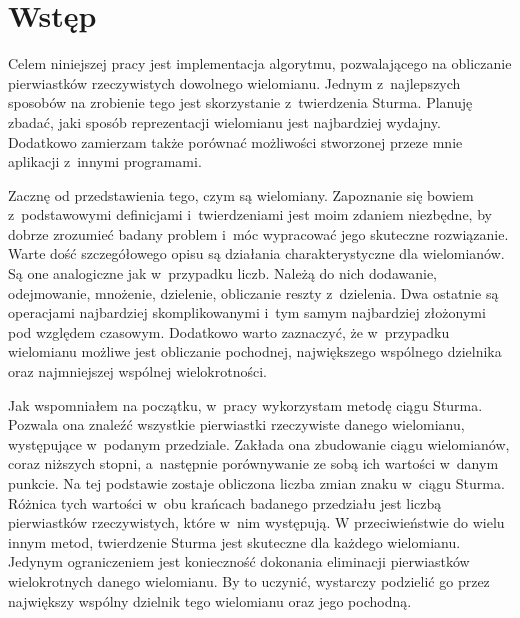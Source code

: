 \chapter{Wstęp}

Celem niniejszej pracy jest implementacja algorytmu, pozwalającego na obliczanie pierwiastków rzeczywistych dowolnego wielomianu. Jednym z~najlepszych sposobów na zrobienie tego jest skorzystanie z~twierdzenia Sturma. Planuję zbadać, jaki sposób reprezentacji wielomianu jest najbardziej wydajny. Dodatkowo zamierzam także porównać możliwości stworzonej przeze mnie aplikacji z~innymi programami.

Zacznę od przedstawienia tego, czym są wielomiany. Zapoznanie się bowiem z~podstawowymi definicjami i~twierdzeniami jest moim zdaniem niezbędne, by dobrze zrozumieć badany problem i~móc wypracować jego skuteczne rozwiązanie. Warte dość szczegółowego opisu są działania charakterystyczne dla wielomianów. Są one analogiczne jak w~przypadku liczb. Należą do nich dodawanie, odejmowanie, mnożenie, dzielenie, obliczanie reszty z~dzielenia. Dwa ostatnie są operacjami najbardziej skomplikowanymi i~tym samym najbardziej złożonymi pod względem czasowym. Dodatkowo warto zaznaczyć, że w~przypadku wielomianu możliwe jest obliczanie pochodnej, największego wspólnego dzielnika oraz najmniejszej wspólnej wielokrotności.

Jak wspomniałem na początku, w~pracy wykorzystam metodę ciągu Sturma. Pozwala ona znaleźć wszystkie pierwiastki rzeczywiste danego wielomianu, występujące w~podanym przedziale. Zakłada ona zbudowanie ciągu wielomianów, coraz niższych stopni, a~następnie porównywanie ze sobą ich wartości w~danym punkcie. Na tej podstawie zostaje obliczona liczba zmian znaku w~ciągu Sturma. Różnica tych wartości w~obu krańcach badanego przedziału jest liczbą pierwiastków rzeczywistych, które w~nim występują. W przeciwieństwie do wielu innym metod, twierdzenie Sturma jest skuteczne dla każdego wielomianu. Jedynym ograniczeniem jest konieczność dokonania eliminacji pierwiastków wielokrotnych danego wielomianu. By to uczynić, wystarczy podzielić go przez największy wspólny dzielnik tego wielomianu oraz jego pochodną.

